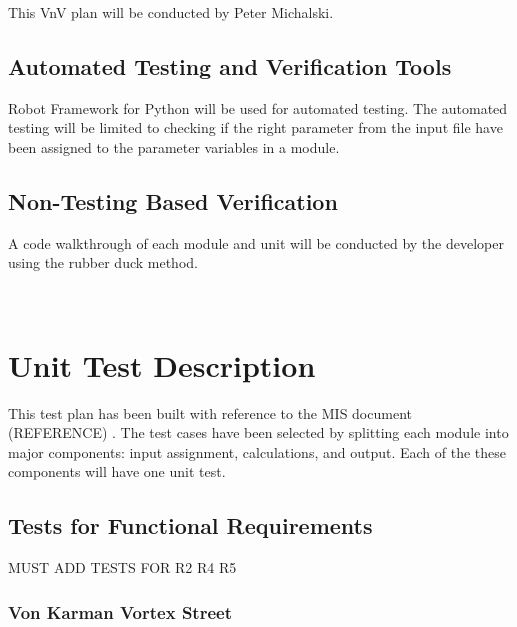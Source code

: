 \documentclass[12pt, titlepage]{article}
\begin{document}
This VnV plan will be conducted by Peter Michalski.

\subsection{Automated Testing and Verification Tools}

Robot Framework for Python will be used for automated testing. The automated testing will be limited to checking if the right parameter from the input file have been assigned to the parameter variables in a module.

\subsection{Non-Testing Based Verification}

A code walkthrough of each module and unit will be conducted by the developer using the rubber duck method.

~\newpage

\section{Unit Test Description}
\label{unittest}

This test plan has been built with reference to the MIS document (REFERENCE) . The test cases have been selected by splitting each module into major components: input assignment, calculations, and output. Each of the these components will have one unit test.

\subsection{Tests for Functional Requirements}

MUST ADD TESTS FOR R2 R4 R5

\subsubsection{Von Karman Vortex Street}

\end{document}
